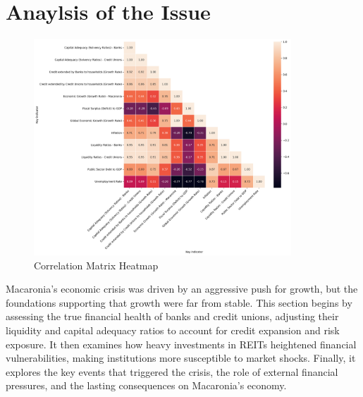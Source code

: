 \onecolumn
\section*{Anaylsis of the Issue}

\begin{figure}[H]
     \centering
     \includegraphics[width=0.86\textwidth]{correlation_matrix.png} %
     \caption{Correlation Matrix Heatmap}
     \label{fig:correlation_matrix}
\end{figure}


Macaronia’s economic crisis was driven by an aggressive push for growth, but the foundations supporting that growth were far from stable. 
This section begins by assessing the true financial health of banks and credit unions, adjusting their liquidity and capital adequacy ratios to account for credit expansion and risk exposure.
It then examines how heavy investments in REITs heightened financial vulnerabilities, making institutions more susceptible to market shocks. Finally, it explores the key events that triggered the crisis, 
the role of external financial pressures, and the lasting consequences on Macaronia’s economy.


